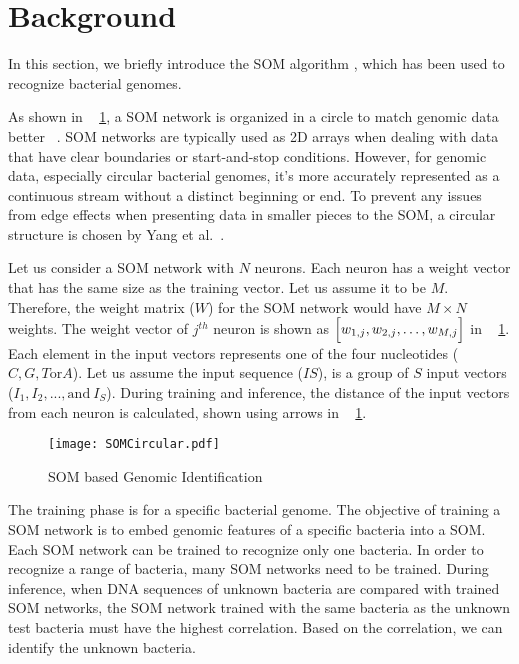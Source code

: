 \section{Background}
In this section, we briefly introduce the SOM algorithm \cite{Yang2018RiBoSOM}, which has been used to recognize bacterial genomes.

As shown in \figurename{~ \ref{fig:algorithm}}, a SOM network is organized in a circle to match genomic data better ~\cite{Yang2018RiBoSOM}. SOM networks are typically used as 2D arrays when dealing with data that have clear boundaries or start-and-stop conditions. However, for genomic data, especially circular bacterial genomes, it's more accurately represented as a continuous stream without a distinct beginning or end. To prevent any issues from edge effects when presenting data in smaller pieces to the SOM, a circular structure is chosen by Yang et al.~\cite{Yang2018RiBoSOM}. 

Let us consider a SOM network with $N$ neurons. Each neuron has a weight vector that has the same size as the training vector. Let us assume it to be $M$. Therefore, the weight matrix ($W$) for the SOM network would have $M{\times}N$ weights. The weight vector of $j^{th}$ neuron is shown as $\Bigl[ w_{1,j},w_{2,j},\ldots,w_{M,j}\Bigr]$ in \figurename{~ \ref{fig:algorithm}}. Each element in the input vectors represents one of the four nucleotides ($C,G,T \text{or} A$). Let us assume the input sequence ($IS$), is a group of $S$ input vectors ($I_1, I_2,...,\text{and}~I_S$). During training and inference, the distance of the input vectors from each neuron is calculated, shown using arrows in \figurename{~ \ref{fig:algorithm}}.
\begin{figure}[htb]
	\centerline{\texttt{[image: SOMCircular.pdf]}}
	\caption{SOM based Genomic Identification}
	\label{fig:algorithm}
\end{figure}

The training phase is for a specific bacterial genome. The objective of training a SOM network is to embed genomic features of a specific bacteria into a SOM. Each SOM network can be trained to recognize only one bacteria. In order to recognize a range of bacteria, many SOM networks need to be trained. During inference, when DNA sequences of unknown bacteria are compared with trained SOM networks, the SOM network trained with the same bacteria as the unknown test bacteria must have the highest correlation. Based on the correlation, we can identify the unknown bacteria. 


